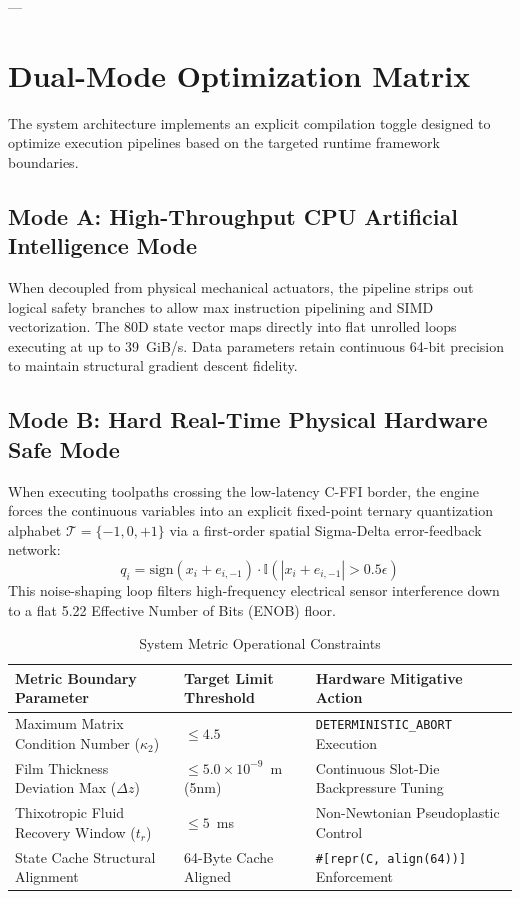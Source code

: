 \documentclass[11pt,twoside]{article}
\begin{document}
---

\section{Dual-Mode Optimization Matrix}
The system architecture implements an explicit compilation toggle designed to optimize execution pipelines based on the targeted runtime framework boundaries.

\subsection{Mode A: High-Throughput CPU Artificial Intelligence Mode}
When decoupled from physical mechanical actuators, the pipeline strips out logical safety branches to allow max instruction pipelining and SIMD vectorization. The 80D state vector maps directly into flat unrolled loops executing at up to 39~GiB/s. Data parameters retain continuous 64-bit precision to maintain structural gradient descent fidelity.

\subsection{Mode B: Hard Real-Time Physical Hardware Safe Mode}
When executing toolpaths crossing the low-latency C-FFI border, the engine forces the continuous variables into an explicit fixed-point ternary quantization alphabet $\mathcal{T} = \{-1, 0, +1\}$ via a first-order spatial Sigma-Delta error-feedback network:
\begin{equation}
    q_i = \text{sign}\left(x_i + e_{i,-1}\right) \cdot \mathbb{I}\left(|x_i + e_{i,-1}| > 0.5\epsilon\right)
\end{equation}
This noise-shaping loop filters high-frequency electrical sensor interference down to a flat 5.22 Effective Number of Bits (ENOB) floor. 

\begin{table}[h!]
\centering
\caption{System Metric Operational Constraints}
\begin{tabular}{lll}
\toprule
\textbf{Metric Boundary Parameter} & \textbf{Target Limit Threshold} & \textbf{Hardware Mitigative Action} \\
\midrule
Maximum Matrix Condition Number ($\kappa_2$) & $\le 4.5$ & \texttt{DETERMINISTIC\_ABORT} Execution \\
Film Thickness Deviation Max ($\Delta z$) & $\le 5.0 \times 10^{-9}$~m (5nm) & Continuous Slot-Die Backpressure Tuning \\
Thixotropic Fluid Recovery Window ($t_r$) & $\le 5$~ms & Non-Newtonian Pseudoplastic Control \\
State Cache Structural Alignment & 64-Byte Cache Aligned & \texttt{\#[repr(C, align(64))]} Enforcement \\
\bottomrule
\end{tabular}
\end{table}
\end{document}
